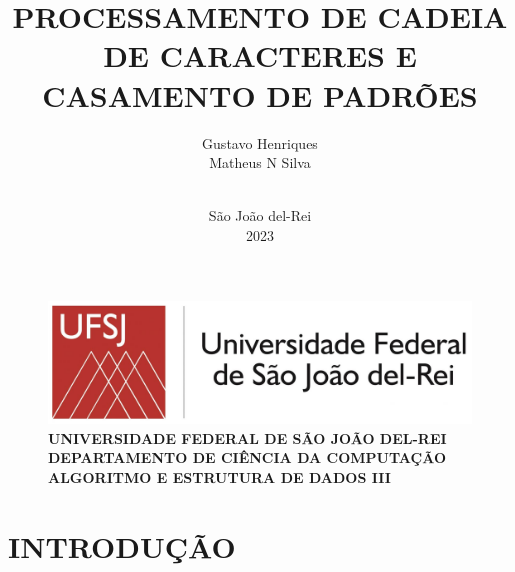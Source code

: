 \documentclass[12pt]{article}
\begin{document}
    \begin{figure}
        \centering
        \includegraphics[width=0.35\linewidth]{Figuras/ufsj-logo-2018}
        \\\setlength{\parskip}{1cm}
        \textbf{UNIVERSIDADE FEDERAL DE SÃO JOÃO DEL-REI \\
         DEPARTAMENTO DE CIÊNCIA DA COMPUTAÇÃO\\
         ALGORITMO E ESTRUTURA DE DADOS III}\\

        \label{fig:ufsj-logo-2018}
    \end{figure}
    
    \author{Gustavo Henriques \\ Matheus N Silva}

    \title{ 
        \vspace{5cm} %
		    \textbf{PROCESSAMENTO DE CADEIA DE CARACTERES E CASAMENTO DE PADRÕES}
		\vspace{5cm} %
	}
    \date{$ $\\ São João del-Rei \\ 2023}
    \maketitle
    \thispagestyle{empty} %
    \newpage
    
    \setcounter{page}{1} %
    \listoffigures

    \newpage
    \tableofcontents %
    
    \newpage
    \setcounter{page}{1} %
    \section{INTRODUÇÃO} %
\end{document}

